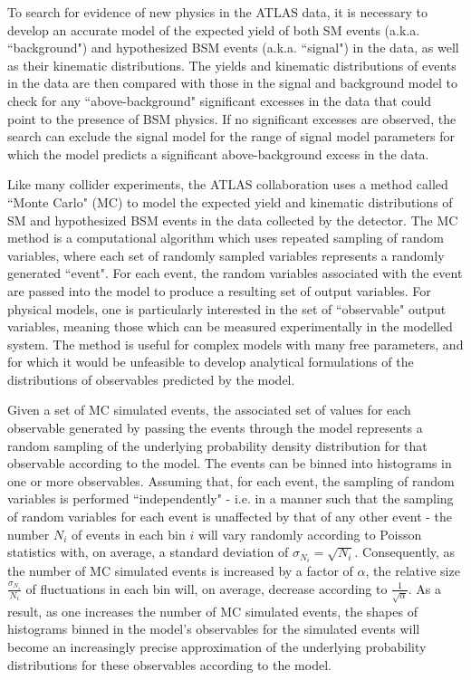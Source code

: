 \label{chapter:mc}

To search for evidence of new physics in the ATLAS data, it is necessary to develop an accurate model of the expected yield of both SM events (a.k.a. ``background") and hypothesized BSM events (a.k.a. ``signal") in the data, as well as their kinematic distributions. The yields and kinematic distributions of events in the data are then compared with those in the signal and background model to check for any ``above-background" significant excesses in the data that could point to the presence of BSM physics. If no significant excesses are observed, the search can exclude the signal model for the range of signal model parameters for which the model predicts a significant above-background excess in the data.

Like many collider experiments, the ATLAS collaboration uses a method called ``Monte Carlo" (MC) to model the expected yield and kinematic distributions of SM and hypothesized BSM events in the data collected by the detector. The MC method is a computational algorithm which uses repeated sampling of random variables, where each set of randomly sampled variables represents a randomly generated ``event". For each event, the random variables associated with the event are passed into the model to produce a resulting set of output variables. For physical models, one is particularly interested in the set of ``observable" output variables, meaning those which can be measured experimentally in the modelled system. The method is useful for complex models with many free parameters, and for which it would be unfeasible to develop analytical formulations of the distributions of observables predicted by the model. 

Given a set of MC simulated events, the associated set of values for each observable generated by passing the events through the model represents a random sampling of the underlying probability density distribution for that observable according to the model. The events can be binned into histograms in one or more observables. Assuming that, for each event, the sampling of random variables is performed ``independently" - i.e. in a manner such that the sampling of random variables for each event is unaffected by that of any other event - the number $N_i$ of events in each bin $i$ will vary randomly according to Poisson statistics with, on average, a standard deviation of $\sigma_{N_i}=\sqrt{N_i}$. Consequently, as the number of MC simulated events is increased by a factor of $\alpha$, the relative size $\frac{\sigma_{N_i}}{N_i}$ of fluctuations in each bin will, on average, decrease according to $\frac{1}{\sqrt{\alpha}}$. As a result, as one increases the number of MC simulated events, the shapes of histograms binned in the model's observables for the simulated events will become an increasingly precise approximation of the underlying probability distributions for these observables according to the model. 

